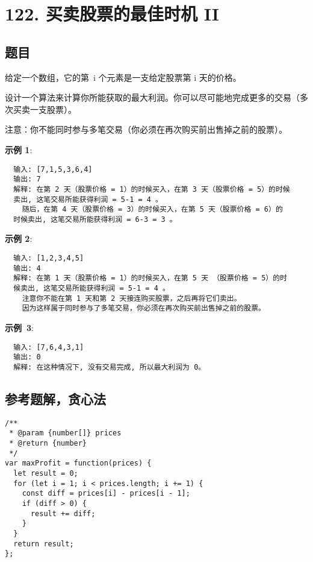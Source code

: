 \newpage
\section{122. 买卖股票的最佳时机 II}
\label{leetcode:122}

\subsection{题目}

给定一个数组，它的第 i 个元素是一支给定股票第 i 天的价格。

设计一个算法来计算你所能获取的最大利润。你可以尽可能地完成更多的交易（多次买卖一支股票）。

注意：你不能同时参与多笔交易（你必须在再次购买前出售掉之前的股票）。

\textbf{示例 1}:

\begin{verbatim}
  输入: [7,1,5,3,6,4]
  输出: 7
  解释: 在第 2 天（股票价格 = 1）的时候买入，在第 3 天（股票价格 = 5）的时候
  卖出, 这笔交易所能获得利润 = 5-1 = 4 。
    随后，在第 4 天（股票价格 = 3）的时候买入，在第 5 天（股票价格 = 6）的
  时候卖出, 这笔交易所能获得利润 = 6-3 = 3 。
\end{verbatim}

\textbf{示例 2}:

\begin{verbatim}
  输入: [1,2,3,4,5]
  输出: 4
  解释: 在第 1 天（股票价格 = 1）的时候买入，在第 5 天 （股票价格 = 5）的时
  候卖出, 这笔交易所能获得利润 = 5-1 = 4 。
    注意你不能在第 1 天和第 2 天接连购买股票，之后再将它们卖出。
    因为这样属于同时参与了多笔交易，你必须在再次购买前出售掉之前的股票。
\end{verbatim}

\textbf{示例 3}:

\begin{verbatim}
  输入: [7,6,4,3,1]
  输出: 0
  解释: 在这种情况下, 没有交易完成, 所以最大利润为 0。
\end{verbatim}

\subsection{参考题解，贪心法}

\begin{verbatim}
/**
 * @param {number[]} prices
 * @return {number}
 */
var maxProfit = function(prices) {
  let result = 0;
  for (let i = 1; i < prices.length; i += 1) {
    const diff = prices[i] - prices[i - 1];
    if (diff > 0) {
      result += diff;
    }
  }
  return result;
};
\end{verbatim}
